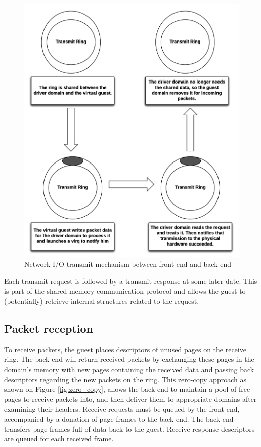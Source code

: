 \begin{figure}[!h]
    \centering
    \includegraphics[scale=0.65]{fig02/transmit_io.png}
    \caption{Network I/O transmit mechanism between front-end and back-end}
    \label{fig:transmit_io}
\end{figure}

Each transmit request is followed by a transmit response at some later date. This is part of the shared-memory communication protocol and allows the guest to (potentially) retrieve internal structures related to the request.

\subsection{Packet reception}
To receive packets, the guest places descriptors of unused pages on the receive ring. The back-end will return received packets by exchanging these pages in the domain's memory with new pages containing the received data and passing back descriptors regarding the new packets on the ring. This zero-copy approach as shown on Figure \ref{fig:zero_copy}, allows the back-end to maintain a pool of free pages to receive packets into, and then deliver them to appropriate domains after examining their headers. Receive requests must be queued by the front-end, accompanied by a donation of page-frames to the back-end. The back-end transfers page frames full of data back to the guest. Receive response descriptors are queued for each received frame.

